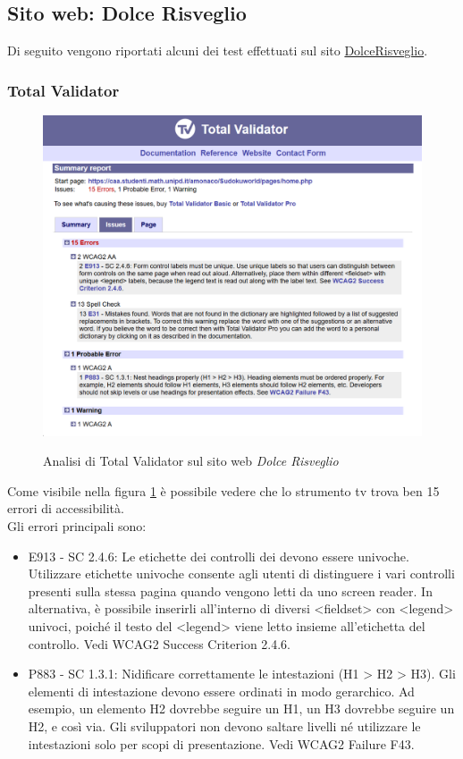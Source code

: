 \subsection{Sito web: Dolce Risveglio}
\noindent Di seguito vengono riportati alcuni dei test effettuati sul sito \href{https://caa.studenti.math.unipd.it/gchecchi/}{DolceRisveglio}.

\subsubsection{Total Validator}
\begin{figure}[H]
    \centering
    \includegraphics[width=0.8\linewidth, alt={Screenshot dell'analisi di Total Validator sul sito web Dolce Risveglio}]{img/TV_sudoku.png}
    \caption{Analisi di Total Validator sul sito web \textit{Dolce Risveglio}}\label{fig:TV_sudoku}
\end{figure}

\noindent Come visibile nella figura \ref{fig:TV_sudoku} è possibile vedere che lo strumento \acrshort{tv} trova ben 15 errori di accessibilità.\\
Gli errori principali sono: 
\begin{itemize}
    \item E913 - SC 2.4.6: Le etichette dei controlli dei  devono essere univoche. Utilizzare etichette univoche consente agli utenti di distinguere i vari controlli presenti sulla stessa pagina quando vengono letti da uno screen reader. In alternativa, è possibile inserirli all’interno di diversi <fieldset> con <legend> univoci, poiché il testo del <legend> viene letto insieme all’etichetta del controllo. Vedi WCAG2 Success Criterion 2.4.6.
    \item P883 - SC 1.3.1: Nidificare correttamente le intestazioni (H1 > H2 > H3). Gli elementi di intestazione devono essere ordinati in modo gerarchico. Ad esempio, un elemento H2 dovrebbe seguire un H1, un H3 dovrebbe seguire un H2, e così via. Gli sviluppatori non devono saltare livelli né utilizzare le intestazioni solo per scopi di presentazione. Vedi WCAG2 Failure F43.
\end{itemize}


